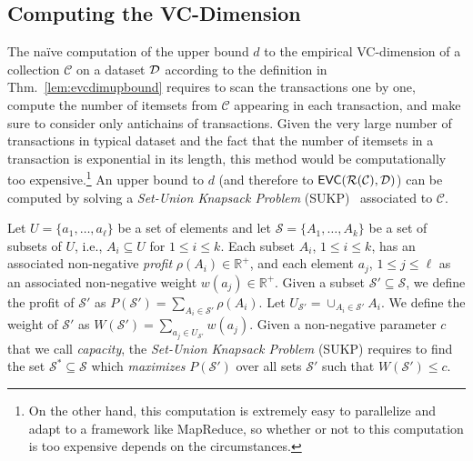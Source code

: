 \subsection{Computing the VC-Dimension}\label{sec:computvc}
The na\"ive computation of the upper bound $d$ to the empirical VC-dimension of a
collection $\mathcal{C}$ on a dataset ${\cal D}$ according to the definition in
Thm.~\ref{lem:evcdimupbound} requires to scan the transactions one by one,
compute the number of itemsets from $\mathcal{C}$ appearing in each transaction,
and make sure to consider only antichains of transactions. Given the very
large number of transactions in typical dataset and the fact that the number of
itemsets in a transaction is exponential in its length, this method would be
computationally too expensive.\footnote{On the other hand, this computation is
extremely easy to parallelize and adapt to a framework like MapReduce, so
whether or not to this computation is too expensive depends on the
circumstances.} An upper bound to $d$ (and therefore to
$\mathsf{EVC}(\mathcal{R}(\mathcal{C}),{\cal D})$) can be computed by solving a \emph{Set-Union
Knapsack Problem} (SUKP)~\citep{GoldschmidtNY94} associated to $\mathcal{C}$.

\begin{definition}\label{def:sukp}
  Let $U=\{a_1,\dotsc,a_\ell\}$ be a set of elements and let
  $\mathcal{S}=\{A_1,\dotsc,A_k\}$ be a set of subsets of $U$, i.e.,
  $A_i\subseteq U$ for $1\le i\le k$. Each subset $A_i$, $1\le i\le k$, has an
  associated non-negative \emph{profit} $\rho(A_i)\in\mathbb{R}^+$, and each
  element $a_j$, $1\le j\le\ell$ as an associated non-negative weight
  $w(a_j)\in\mathbb{R}^+$.  Given a subset $\mathcal{S}'\subseteq\mathcal{S}$,
  we define the profit of $\mathcal{S}'$ as $P(\mathcal{S}')=\sum_{A_i\in
  \mathcal{S}'}\rho(A_i)$. Let $U_{\mathcal{S}'}=\cup_{A_i\in\mathcal{S}'}
  A_i$. We define the weight of $\mathcal{S}'$ as $W(\mathcal{S}')=\sum_{a_j\in
  U_{\mathcal{S}'}} w(a_j)$. Given a non-negative parameter $c$ that we call
  \emph{capacity}, the \emph{Set-Union Knapsack Problem} (SUKP) requires to find
  the set $\mathcal{S}^*\subseteq\mathcal{S}$ which \emph{maximizes}
  $P(\mathcal{S}')$ over all sets $\mathcal{S}'$ such that $W(\mathcal{S}')\le
  c$.
\end{definition}


